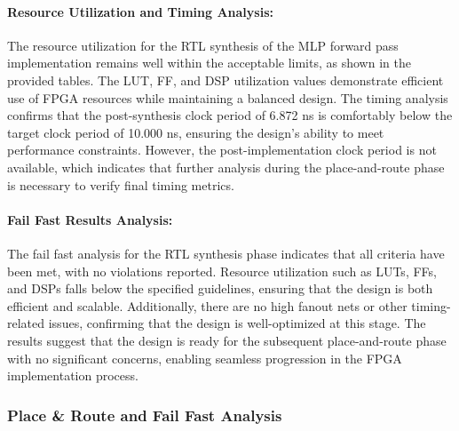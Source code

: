 \documentclass{article}
\begin{document}
\paragraph{Resource Utilization and Timing Analysis:}
The resource utilization for the RTL synthesis of the MLP forward pass implementation remains well within the acceptable limits, as shown in the provided tables. The LUT, FF, and DSP utilization values demonstrate efficient use of FPGA resources while maintaining a balanced design. The timing analysis confirms that the post-synthesis clock period of 6.872 ns is comfortably below the target clock period of 10.000 ns, ensuring the design's ability to meet performance constraints. However, the post-implementation clock period is not available, which indicates that further analysis during the place-and-route phase is necessary to verify final timing metrics.

\paragraph{Fail Fast Results Analysis:}
The fail fast analysis for the RTL synthesis phase indicates that all criteria have been met, with no violations reported. Resource utilization such as LUTs, FFs, and DSPs falls below the specified guidelines, ensuring that the design is both efficient and scalable. Additionally, there are no high fanout nets or other timing-related issues, confirming that the design is well-optimized at this stage. The results suggest that the design is ready for the subsequent place-and-route phase with no significant concerns, enabling seamless progression in the FPGA implementation process.




\subsubsection{Place \& Route and Fail Fast Analysis}
\end{document}
